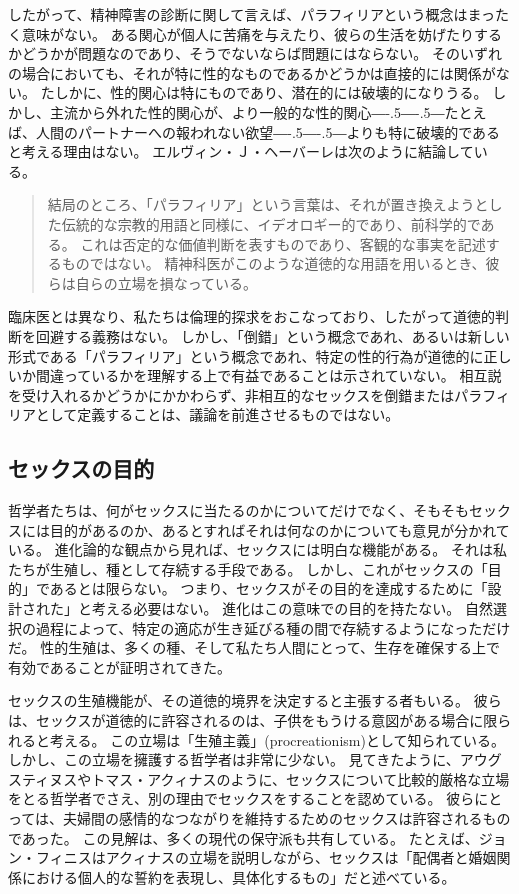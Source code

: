\documentclass[paper=a4,book,openany]{jlreq}
\def\DDASH{―\kern-.5\zw―\kern-.5\zw―} %
\begin{document}
したがって、精神障害の診断に関して言えば、パラフィリアという概念はまったく意味がない。
ある関心が個人に苦痛を与えたり、彼らの生活を妨げたりするかどうかが問題なのであり、そうでないならば問題にはならない。
そのいずれの場合においても、それが特に性的なものであるかどうかは直接的には関係がない。
たしかに、性的関心は特にものであり、潜在的には破壊的になりうる。
しかし、主流から外れた性的関心が、より一般的な性的関心{\DDASH}たとえば、人間のパートナーへの報われない欲望{\DDASH}よりも特に破壊的であると考える理由はない。
エルヴィン・Ｊ・ヘーバーレは次のように結論している。

\begin{quote}
  結局のところ、「パラフィリア」という言葉は、それが置き換えようとした伝統的な宗教的用語と同様に、イデオロギー的であり、前科学的である。
これは否定的な価値判断を表すものであり、客観的な事実を記述するものではない。
精神科医がこのような道徳的な用語を用いるとき、彼らは自らの立場を損なっている。
\citep{haeberle16:_parap}

\end{quote}

臨床医とは異なり、私たちは倫理的探求をおこなっており、したがって道徳的判断を回避する義務はない。
しかし、「倒錯」という概念であれ、あるいは新しい形式である「パラフィリア」という概念であれ、特定の性的行為が道徳的に正しいか間違っているかを理解する上で有益であることは示されていない。
相互説を受け入れるかどうかにかかわらず、非相互的なセックスを倒錯またはパラフィリアとして定義することは、議論を前進させるものではない。

\subsection{セックスの目的}

哲学者たちは、何がセックスに当たるのかについてだけでなく、そもそもセックスには目的があるのか、あるとすればそれは何なのかについても意見が分かれている。
進化論的な観点から見れば、セックスには明白な機能がある。
それは私たちが生殖し、種として存続する手段である。
しかし、これがセックスの「目的」であるとは限らない。
つまり、セックスがその目的を達成するために「設計された」と考える必要はない。
進化はこの意味での目的を持たない。
自然選択の過程によって、特定の適応が生き延びる種の間で存続するようになっただけだ。
性的生殖は、多くの種、そして私たち人間にとって、生存を確保する上で有効であることが証明されてきた。

セックスの生殖機能が、その道徳的境界を決定すると主張する者もいる。
彼らは、セックスが道徳的に許容されるのは、子供をもうける意図がある場合に限られると考える。
この立場は「生殖主義」(procreationism)として知られている。
しかし、この立場を擁護する哲学者は非常に少ない。
見てきたように、アウグスティヌスやトマス・アクィナスのように、セックスについて比較的厳格な立場をとる哲学者でさえ、別の理由でセックスをすることを認めている。
彼らにとっては、夫婦間の感情的なつながりを維持するためのセックスは許容されるものであった。
この見解は、多くの現代の保守派も共有している。
たとえば、ジョン・フィニスはアクィナスの立場を説明しながら、セックスは「配偶者と婚姻関係における個人的な誓約を表現し、具体化するもの」だと述べている\citep[p.392]{finnis08:_marriag}。
\end{document}
